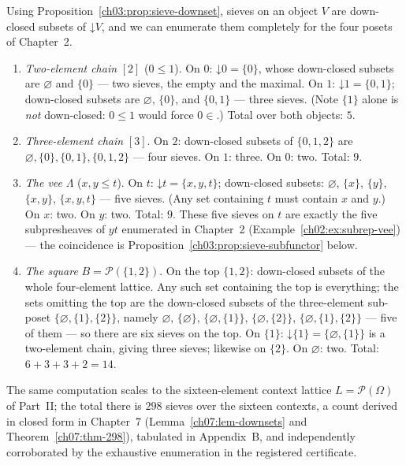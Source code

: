 \begin{example}\label{ch03:ex:sieve-enum}
Using Proposition~\ref{ch03:prop:sieve-downset}, sieves on an object
$V$ are down-closed subsets of $\mathord{\downarrow} V$, and we can
enumerate them completely for the four posets of Chapter~2.
\begin{enumerate}
\item \emph{Two-element chain} $[2]$ ($0 \le 1$). On $0$:
$\mathord{\downarrow} 0 = \{0\}$, whose down-closed subsets are
$\varnothing$ and $\{0\}$ --- two sieves, the empty and the maximal.
On $1$: $\mathord{\downarrow} 1 = \{0, 1\}$; down-closed subsets are
$\varnothing$, $\{0\}$, and $\{0, 1\}$ --- three sieves. (Note
$\{1\}$ alone is \emph{not} down-closed: $0 \le 1$ would force
$0 \in$.) Total over both objects: $5$.
\item \emph{Three-element chain} $[3]$. On $2$: down-closed subsets
of $\{0,1,2\}$ are $\varnothing, \{0\}, \{0,1\}, \{0,1,2\}$ ---
four sieves. On $1$: three. On $0$: two. Total: $9$.
\item \emph{The vee} $\Lambda$ ($x, y \le t$). On $t$:
$\mathord{\downarrow} t = \{x, y, t\}$; down-closed subsets:
$\varnothing$, $\{x\}$, $\{y\}$, $\{x, y\}$, $\{x, y, t\}$ --- five
sieves. (Any set containing $t$ must contain $x$ and $y$.) On $x$:
two. On $y$: two. Total: $9$. These five sieves on $t$ are exactly
the five subpresheaves of $yt$ enumerated in Chapter~2
(Example~\ref{ch02:ex:subrep-vee}) --- the coincidence is
Proposition~\ref{ch03:prop:sieve-subfunctor} below.
\item \emph{The square} $B = \mathcal{P}(\{1,2\})$. On the top
$\{1,2\}$: down-closed subsets of the whole four-element lattice.
Any such set containing the top is everything; the sets omitting the
top are the down-closed subsets of the three-element sub-poset
$\{\varnothing, \{1\}, \{2\}\}$, namely $\varnothing$,
$\{\varnothing\}$, $\{\varnothing, \{1\}\}$,
$\{\varnothing, \{2\}\}$, $\{\varnothing, \{1\}, \{2\}\}$ --- five
of them --- so there are six sieves on the top. On $\{1\}$:
$\mathord{\downarrow}\{1\} = \{\varnothing, \{1\}\}$ is a
two-element chain, giving three sieves; likewise on $\{2\}$. On
$\varnothing$: two. Total: $6 + 3 + 3 + 2 = 14$.
\end{enumerate}
The same computation scales to the sixteen-element context lattice
$L = \mathcal{P}(\Omega)$ of Part~II; the total there is $298$
sieves over the sixteen contexts, a count derived in closed form in
Chapter~7 (Lemma~\ref{ch07:lem-downsets} and
Theorem~\ref{ch07:thm-298}), tabulated in Appendix~B, and
independently corroborated by the exhaustive enumeration in the
registered certificate.
\end{example}

